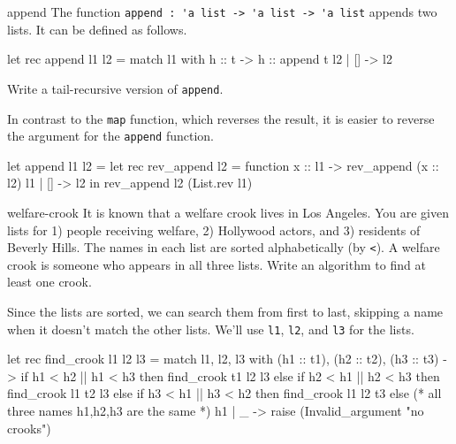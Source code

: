 %
\begin{exercise}{append}
The function \hbox{\lstinline/append : 'a list -> 'a list -> 'a list/} appends two lists.  It can be defined as follows.

\begin{ocaml}
let rec append l1 l2 =
   match l1 with
      h :: t -> h :: append t l2
    | [] -> l2
\end{ocaml}
%
Write a tail-recursive version of \hbox{\lstinline/append/}.

\begin{answer}\ifanswers
In contrast to the \hbox{\lstinline/map/} function, which reverses the result, it is easier to reverse the
argument for the \hbox{\lstinline/append/} function.

\begin{ocaml}
let append l1 l2 =
   let rec rev_append l2 = function
      x :: l1 -> rev_append (x :: l2) l1
    | [] -> l2
   in
      rev_append l2 (List.rev l1)
\end{ocaml}
\fi\end{answer}
\end{exercise}

%
\begin{exercise}{welfare-crook}
It is known that a welfare crook lives in Los Angeles.  You are given lists for 1) people receiving
welfare, 2) Hollywood actors, and 3) residents of Beverly Hills.  The names in each list are
sorted alphabetically (by \hbox{\lstinline/</}).  A welfare crook is someone who appears in all three
lists.  Write an algorithm to find at least one crook.

\begin{answer}\ifanswers
Since the lists are sorted, we can search them from first to last, skipping a name when it doesn't
match the other lists.  We'll use \hbox{\lstinline/l1/}, \hbox{\lstinline/l2/}, and \hbox{\lstinline/l3/} for the lists.

\begin{ocaml}
let rec find_crook l1 l2 l3 =
   match l1, l2, l3 with
      (h1 :: t1), (h2 :: t2), (h3 :: t3) ->
         if      h1 < h2 || h1 < h3 then find_crook t1 l2 l3
         else if h2 < h1 || h2 < h3 then find_crook l1 t2 l3
         else if h3 < h1 || h3 < h2 then find_crook l1 l2 t3
         else (* all three names h1,h2,h3 are the same *) h1
    | _ ->
         raise (Invalid_argument "no crooks")
\end{ocaml}
\fi\end{answer}
\end{exercise}

